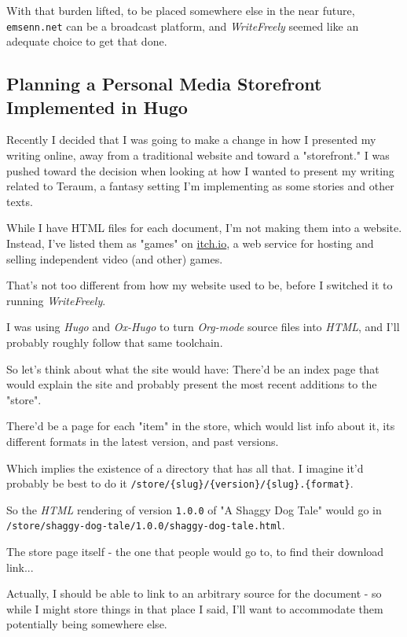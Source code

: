 \documentclass[11pt]{article}
\begin{document}
With that burden lifted, to be placed somewhere else in the near
future, \texttt{emsenn.net} can be a broadcast platform, and \emph{WriteFreely}
seemed like an adequate choice to get that done.

\subsection*{Planning a Personal Media Storefront Implemented in Hugo}
\label{sec:orgb3d3e90}
Recently I decided that I was going to make a change in how I
presented my writing online, away from a traditional website and
toward a "storefront." I was pushed toward the decision when looking
at how I wanted to present my writing related to Teraum, a fantasy
setting I'm implementing as some stories and other texts.

While I have HTML files for each document, I'm not making them into a
website. Instead, I've listed them as "games" on \href{https://itch.io/}{itch.io}, a web
service for hosting and selling independent video (and other) games.

That's not too different from how my website used to be, before I
switched it to running \emph{WriteFreely}.

I was using \emph{Hugo} and \emph{Ox-Hugo} to turn \emph{Org-mode} source files into
\emph{HTML}, and I'll probably roughly follow that same toolchain.

So let's think about what the site would have: There'd be an index
page that would explain the site and probably present the most recent
additions to the "store".

There'd be a page for each "item" in the store, which would list info
about it, its different formats in the latest version, and past
versions.

Which implies the existence of a directory that has all that. I
imagine it'd probably be best to do it
\texttt{/store/\{slug\}/\{version\}/\{slug\}.\{format\}}.

So the \emph{HTML} rendering of version \texttt{1.0.0} of "A Shaggy Dog Tale"
would go in \texttt{/store/shaggy-dog-tale/1.0.0/shaggy-dog-tale.html}.

The store page itself - the one that people would go to, to find their
download link...

Actually, I should be able to link to an arbitrary source for the
document - so while I might store things in that place I said, I'll
want to accommodate them potentially being somewhere else.
\end{document}

